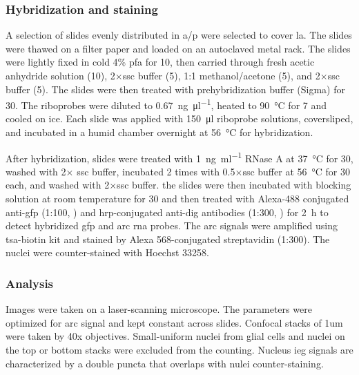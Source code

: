 \subsubsection{Hybridization and staining}
A selection of slides evenly distributed in \gls{a/p} were selected to cover \gls{la}. The slides were thawed on a filter paper and loaded on an autoclaved metal rack. The slides were lightly fixed in cold 4\% \gls{pfa} for \SI{10}{\min}, then carried through fresh acetic anhydride solution (\SI{10}{\min}), 2$\times$\gls{ssc} buffer (\SI{5}{\min}), 1:1 methanol\slash acetone (\SI{5}{\min}), and 2$\times$\gls{ssc} buffer (\SI{5}{\min}). The slides were then treated with prehybridization buffer (Sigma) for \SI{30}{\min}. The riboprobes were diluted to \SI{0.67}{\ng\per\ul}, heated to \SI{90}{\celsius} for \SI{7}{\min} and cooled on ice. Each slide was applied with \SI{150}{\ul} riboprobe solutions, coversliped, and incubated in a humid chamber overnight at \SI{56}{\celsius} for hybridization.

After hybridization, slides were treated with \SI{1}{\ng\per\ml} RNase A at \SI{37}{\celsius} for \SI{30}{\min}, washed with 2$\times$ \gls{ssc} buffer, incubated 2 times with 0.5$\times$\gls{ssc} buffer at \SI{56}{\celsius} for \SI{30}{\min} each, and washed with 2$\times$\gls{ssc} buffer. the slides were then incubated with blocking solution at room temperature for \SI{30}{\min} and then treated with Alexa-488 conjugated anti-\gls{gfp} (1:100, ) and \gls{hrp}-conjugated anti-\gls{dig} antibodies (1:300, ) for \SI{2}{\hour} to detect hybridized \gls{gfp} and \gls{arc} \gls{rna} probes. The \gls{arc} signals were amplified using \gls{tsa}-biotin kit and stained by Alexa 568-conjugated streptavidin (1:300). The nuclei were counter-stained with Hoechst 33258.

\subsubsection{Analysis}
Images were taken on a laser-scanning microscope. The parameters were optimized for \gls{arc} signal and kept constant across slides. Confocal stacks of 1um were taken by 40x objectives. Small-uniform nuclei from glial cells and nuclei on the top or bottom stacks were excluded from the counting. Nucleus \gls{ieg} signals are characterized by a double puncta that overlaps with nulei counter-staining. %

